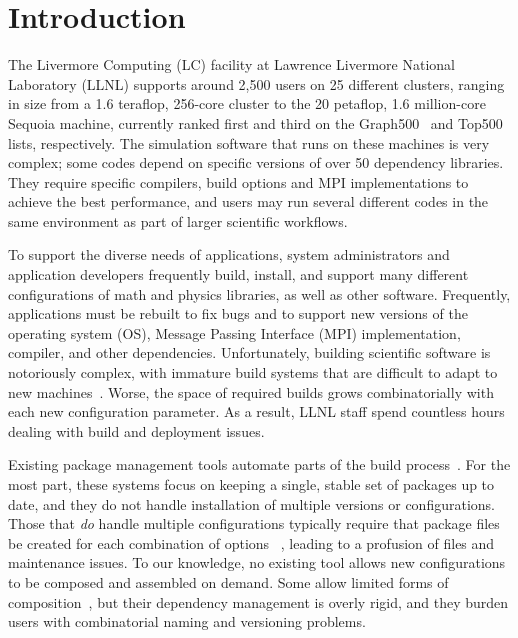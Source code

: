 
\section{Introduction}
\label{sec:intro}

The Livermore Computing (LC) facility at Lawrence Livermore National Laboratory
(LLNL) supports around 2,500 users on 25 different clusters, ranging
in size from a 1.6 teraflop, 256-core cluster to the
20 petaflop, 1.6 million-core Sequoia machine, currently ranked first and
third on the Graph500~\cite{graph500} and Top500~\cite{top500}
lists, respectively.
%
%
The simulation software that runs on these machines is very complex; some
codes depend on specific versions of over 50 dependency libraries.
They require specific compilers, build options and MPI implementations to
achieve the best performance, and users may run several
different codes in the same environment as part of larger
scientific workflows.

To support the diverse needs of applications, system administrators
and application developers frequently build, install, and support many
different configurations of math and physics libraries, as well as
other software.  Frequently, applications must be rebuilt to fix bugs
and to support new versions of the operating system (OS), Message
Passing Interface (MPI) implementation, compiler, and other
dependencies.  Unfortunately, building scientific software is
notoriously complex, with immature build systems that are difficult to
adapt to new
machines~\cite{dubois+:comp-sci-eng,hoste+:pyhpc12,wilson+:corr}.
Worse, the space of required builds grows combinatorially with each
new configuration parameter. As a result, LLNL staff spend countless
hours dealing with build and deployment issues.

Existing package management tools automate parts of the build
process~\cite{bsdports,digirolamo:smithy,dolstra+:icfp08,dolstra+:lisa04,hashdist,homebrew,hoste+:pyhpc12,macports,thiruvathukal:gentoo04}.
For the most part, these systems focus on keeping a single, stable set of
packages up to date, and they do not handle installation of multiple
versions or configurations.  Those that {\it do} handle multiple configurations
typically require that package files be created for each combination of
options~ \cite{digirolamo:smithy,dolstra+:icfp08,dolstra+:lisa04,hashdist,hoste+:pyhpc12},
leading to a profusion of files and maintenance issues.
To our knowledge, no existing tool allows new configurations to be composed
and assembled on demand.  Some allow limited forms of
composition~\cite{hoste+:pyhpc12,dolstra+:icfp08,dolstra+:lisa04}, but their
dependency management is overly rigid, and they burden users with
combinatorial naming and versioning problems.

